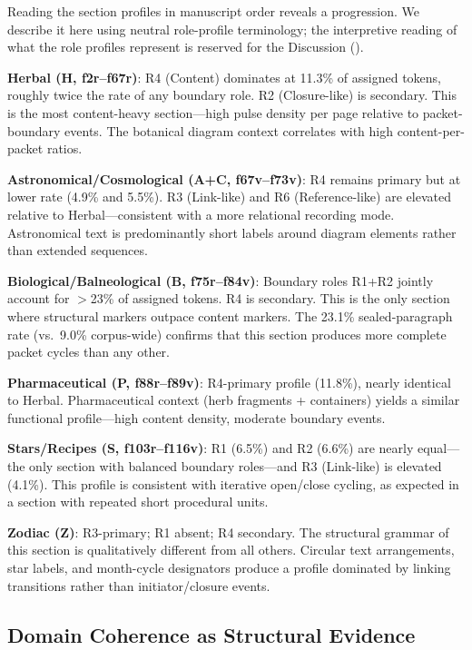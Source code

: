 \documentclass[11pt,a4paper,twocolumn]{article}
\begin{document}
Reading the section profiles in manuscript order reveals a progression. We describe it here using neutral role-profile terminology; the interpretive reading of what the role profiles represent is reserved for the Discussion ().

\textbf{Herbal (H, f2r--f67r)}: R4 (Content) dominates at 11.3\% of assigned tokens, roughly twice the rate of any boundary role. R2 (Closure-like) is secondary. This is the most content-heavy section---high pulse density per page relative to packet-boundary events. The botanical diagram context correlates with high content-per-packet ratios.

\textbf{Astronomical/Cosmological (A+C, f67v--f73v)}: R4 remains primary but at lower rate (4.9\% and 5.5\%). R3 (Link-like) and R6 (Reference-like) are elevated relative to Herbal---consistent with a more relational recording mode. Astronomical text is predominantly short labels around diagram elements rather than extended sequences.

\textbf{Biological/Balneological (B, f75r--f84v)}: Boundary roles R1+R2 jointly account for $>$23\% of assigned tokens. R4 is secondary. This is the only section where structural markers outpace content markers. The 23.1\% sealed-paragraph rate (vs.\ 9.0\% corpus-wide) confirms that this section produces more complete packet cycles than any other.

\textbf{Pharmaceutical (P, f88r--f89v)}: R4-primary profile (11.8\%), nearly identical to Herbal. Pharmaceutical context (herb fragments + containers) yields a similar functional profile---high content density, moderate boundary events.

\textbf{Stars/Recipes (S, f103r--f116v)}: R1 (6.5\%) and R2 (6.6\%) are nearly equal---the only section with balanced boundary roles---and R3 (Link-like) is elevated (4.1\%). This profile is consistent with iterative open/close cycling, as expected in a section with repeated short procedural units.

\textbf{Zodiac (Z)}: R3-primary; R1 absent; R4 secondary. The structural grammar of this section is qualitatively different from all others. Circular text arrangements, star labels, and month-cycle designators produce a profile dominated by linking transitions rather than initiator/closure events.

\subsection{Domain Coherence as Structural Evidence}
\end{document}

